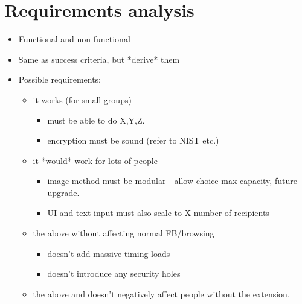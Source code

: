\section{Requirements analysis}
    \begin{itemize}
	\item Functional and non-functional
	\item Same as success criteria, but *derive* them
	\item Possible requirements:
            \begin{itemize}
                \item it works (for small groups)
                    \begin{itemize}
                        \item must be able to do X,Y,Z.
                        \item encryption must be sound (refer to NIST etc.)
                    \end{itemize}
                \item it *would* work for lots of people
                    \begin{itemize}
                        \item image method must be modular - allow choice max capacity, future upgrade.
                        \item UI and text input must also scale to X number of recipients
                    \end{itemize}
                \item the above without affecting normal FB/browsing
                    \begin{itemize}
                        \item doesn't add massive timing loads
                        \item doesn't introduce any security holes
                    \end{itemize}
                \item the above and doesn't negatively affect people without the extension.
            \end{itemize}
    \end{itemize}
